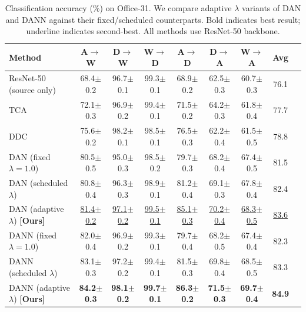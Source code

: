 \documentclass[pdflatex,sn-mathphys-num]{sn-jnl}
\theoremstyle{thmstyleone}
\theoremstyle{thmstyletwo}
\theoremstyle{thmstylethree}
\begin{document}
\begin{table}
    \centering
    \setlength{\tabcolsep}{5pt}
    \caption{Classification accuracy (\%) on Office-31. We compare adaptive $\lambda$ variants of DAN and DANN against their fixed/scheduled counterparts. Bold indicates best result; underline indicates second-best. All methods use ResNet-50 backbone.}
    \label{tab:office31_full}
    \begin{tabular}{lcccccccc}
        \toprule
        \textbf{Method} & \textbf{A$\to$W} & \textbf{D$\to$W} & \textbf{W$\to$D} & \textbf{A$\to$D} & \textbf{D$\to$A} & \textbf{W$\to$A} & \textbf{Avg} \\
        \midrule
        ResNet-50 (source only) & 68.4$\pm$0.2 & 96.7$\pm$0.1 & 99.3$\pm$0.1 & 68.9$\pm$0.2 & 62.5$\pm$0.3 & 60.7$\pm$0.3 & 76.1 \\
        TCA~\cite{pan2011tca} & 72.1$\pm$0.3 & 96.9$\pm$0.2 & 99.4$\pm$0.1 & 71.5$\pm$0.2 & 64.2$\pm$0.3 & 61.8$\pm$0.4 & 77.7 \\
        DDC~\cite{tzeng2014ddc} & 75.6$\pm$0.2 & 98.2$\pm$0.1 & 98.5$\pm$0.1 & 76.5$\pm$0.3 & 62.2$\pm$0.4 & 61.5$\pm$0.5 & 78.8 \\
        \midrule
        DAN (fixed $\lambda=1.0$)~\cite{long2015dan} & 80.5$\pm$0.5 & 95.0$\pm$0.3 & 98.5$\pm$0.2 & 79.7$\pm$0.3 & 68.2$\pm$0.4 & 67.4$\pm$0.5 & 81.5 \\
        DAN (scheduled $\lambda$) & 80.8$\pm$0.4 & 96.3$\pm$0.3 & 98.9$\pm$0.1 & 81.2$\pm$0.4 & 69.1$\pm$0.3 & 67.8$\pm$0.4 & 82.4 \\
        DAN (adaptive $\lambda$) \textbf{[Ours]} & \underline{81.4$\pm$0.2} & \underline{97.1$\pm$0.2} & \underline{99.5$\pm$0.1} & \underline{85.1$\pm$0.3} & \underline{70.2$\pm$0.4} & \underline{68.3$\pm$0.5} & \underline{83.6} \\
        \midrule
        DANN (fixed $\lambda=1.0$)~\cite{ganin2016dann} & 82.0$\pm$0.4 & 96.9$\pm$0.2 & 99.3$\pm$0.1 & 79.7$\pm$0.4 & 68.2$\pm$0.5 & 67.4$\pm$0.4 & 82.3 \\
        DANN (scheduled $\lambda$)~\cite{ganin2016dann} & 83.1$\pm$0.3 & 97.2$\pm$0.2 & 99.4$\pm$0.1 & 81.5$\pm$0.3 & 69.8$\pm$0.4 & 68.5$\pm$0.5 & 83.3 \\
        DANN (adaptive $\lambda$) \textbf{[Ours]} & \textbf{84.2$\pm$0.3} & \textbf{98.1$\pm$0.2} & \textbf{99.7$\pm$0.1} & \textbf{86.3$\pm$0.2} & \textbf{71.5$\pm$0.3} & \textbf{69.7$\pm$0.4} & \textbf{84.9} \\
        \bottomrule
    \end{tabular}
\end{table}
\clearpage
\end{document}
